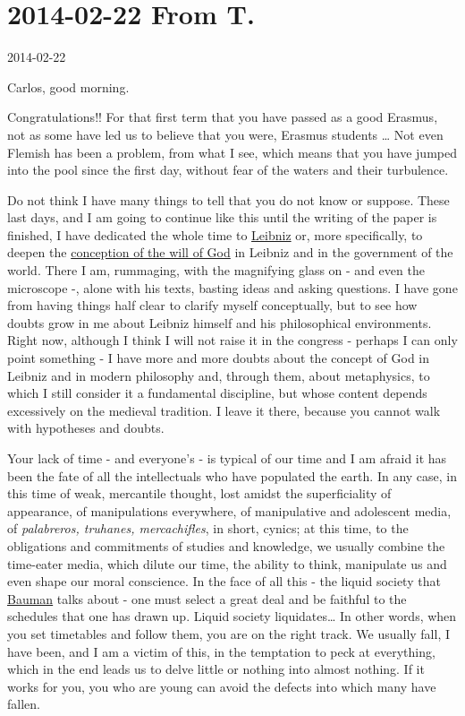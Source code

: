 \documentclass[]{book}
\begin{document}
\hypertarget{fromT20140222}{%
\section*{2014-02-22 From T.}\label{fromT20140222}}

2014-02-22

Carlos, good morning.

Congratulations!! For that first term that you have passed as a good Erasmus, not as some have led us to believe that you were, Erasmus students \ldots{} Not even Flemish has been a problem, from what I see, which means that you have jumped into the pool since the first day, without fear of the waters and their turbulence.

Do not think I have many things to tell that you do not know or suppose. These last days, and I am going to continue like this until the writing of the paper is finished, I have dedicated the whole time to \href{https://en.wikipedia.org/wiki/Gottfried_Wilhelm_Leibniz}{Leibniz} or, more specifically, to deepen the \href{https://en.wikipedia.org/wiki/Th\%C3\%A9odic\%C3\%A9e}{conception of the will of God} in Leibniz and in the government of the world. There I am, rummaging, with the magnifying glass on - and even the microscope -, alone with his texts, basting ideas and asking questions. I have gone from having things half clear to clarify myself conceptually, but to see how doubts grow in me about Leibniz himself and his philosophical environments. Right now, although I think I will not raise it in the congress - perhaps I can only point something - I have more and more doubts about the concept of God in Leibniz and in modern philosophy and, through them, about metaphysics, to which I still consider it a fundamental discipline, but whose content depends excessively on the medieval tradition. I leave it there, because you cannot walk with hypotheses and doubts.

Your lack of time - and everyone's - is typical of our time and I am afraid it has been the fate of all the intellectuals who have populated the earth. In any case, in this time of weak, mercantile thought, lost amidst the superficiality of appearance, of manipulations everywhere, of manipulative and adolescent media, of \emph{palabreros, truhanes, mercachifles}, in short, cynics; at this time, to the obligations and commitments of studies and knowledge, we usually combine the time-eater media, which dilute our time, the ability to think, manipulate us and even shape our moral conscience. In the face of all this - the liquid society that \href{https://en.wikipedia.org/wiki/Zygmunt_Bauman}{Bauman} talks about - one must select a great deal and be faithful to the schedules that one has drawn up. \citep{bauman2013liquid} Liquid society liquidates\ldots{} In other words, when you set timetables and follow them, you are on the right track. We usually fall, I have been, and I am a victim of this, in the temptation to peck at everything, which in the end leads us to delve little or nothing into almost nothing. If it works for you, you who are young can avoid the defects into which many have fallen.
\end{document}
